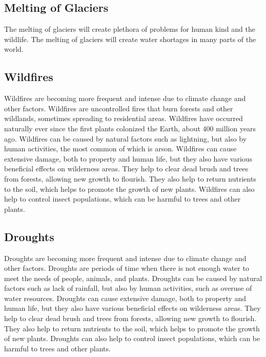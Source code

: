 \documentclass{article}
\begin{document}
\subsection{Melting of Glaciers}
The melting of glaciers will create plethora of problems for human kind and the
wildlife. The melting of glaciers will create water shortages in many parts of
the world.

\subsection{Wildfires}
Wildfires are becoming more frequent and intense due to climate change and
other factors. Wildfires are uncontrolled fires that burn forests and other
wildlands, sometimes spreading to residential areas. Wildfires have occurred
naturally ever since the first plants colonized the Earth, about 400 million
years ago. Wildfires can be caused by natural factors such as lightning, but
also by human activities, the most common of which is arson. Wildfires can
cause extensive damage, both to property and human life, but they also have
various beneficial effects on wilderness areas. They help to clear dead brush
and trees from forests, allowing new growth to flourish. They also help to
return nutrients to the soil, which helps to promote the growth of new plants.
Wildfires can also help to control insect populations, which can be harmful to
trees and other plants.

\subsection{Droughts}
Droughts are becoming more frequent and intense due to climate change and other
factors. Droughts are periods of time when there is not enough water to meet
the needs of people, animals, and plants. Droughts can be caused by natural
factors such as lack of rainfall, but also by human activities, such as overuse
of water resources. Droughts can cause extensive damage, both to property and
human life, but they also have various beneficial effects on wilderness areas.
They help to clear dead brush and trees from forests, allowing new growth to
flourish. They also help to return nutrients to the soil, which helps to
promote the growth of new plants. Droughts can also help to control insect
populations, which can be harmful to trees and other plants.
\end{document}
